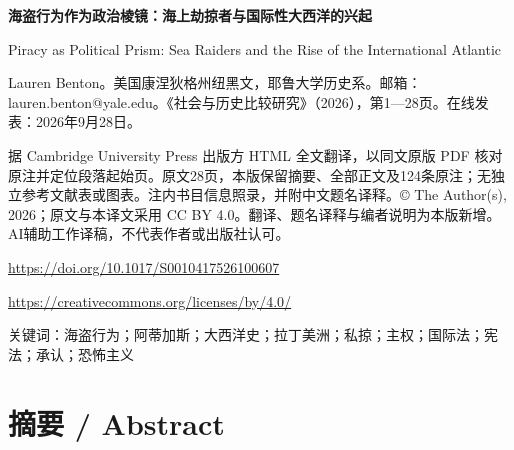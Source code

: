 \documentclass[10pt,a4paper]{article}
\begin{document}
{\Large\bfseries 海盗行为作为政治棱镜：海上劫掠者与国际性大西洋的兴起\par}\medskip
Piracy as Political Prism: Sea Raiders and the Rise of the International Atlantic\par
Lauren Benton。美国康涅狄格州纽黑文，耶鲁大学历史系。邮箱：lauren.benton@yale.edu。《社会与历史比较研究》（2026），第1—28页。在线发表：2026年9月28日。\par
据 Cambridge University Press 出版方 HTML 全文翻译，以同文原版 PDF 核对原注并定位段落起始页。原文28页，本版保留摘要、全部正文及124条原注；无独立参考文献表或图表。注内书目信息照录，并附中文题名译释。© The Author(s), 2026；原文与本译文采用 CC BY 4.0。翻译、题名译释与编者说明为本版新增。AI辅助工作译稿，不代表作者或出版社认可。\par
\url{https://doi.org/10.1017/S0010417526100607}\par
\url{https://creativecommons.org/licenses/by/4.0/}\par
关键词：海盗行为；阿蒂加斯；大西洋史；拉丁美洲；私掠；主权；国际法；宪法；承认；恐怖主义\par\bigskip
{}\section*{摘要 / Abstract}
\end{document}

